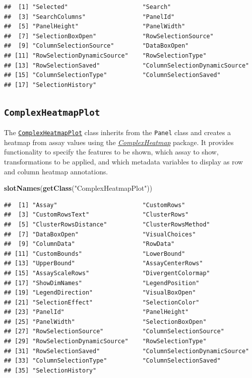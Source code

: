 \documentclass[
]{book}
\newenvironment{Shaded}{\begin{snugshade}}{\end{snugshade}}
\newcommand{\KeywordTok}[1]{\textcolor[rgb]{0.13,0.29,0.53}{\textbf{#1}}}
\newcommand{\NormalTok}[1]{#1}
\newcommand{\StringTok}[1]{\textcolor[rgb]{0.31,0.60,0.02}{#1}}
\begin{document}
\begin{verbatim}
##  [1] "Selected"                     "Search"                      
##  [3] "SearchColumns"                "PanelId"                     
##  [5] "PanelHeight"                  "PanelWidth"                  
##  [7] "SelectionBoxOpen"             "RowSelectionSource"          
##  [9] "ColumnSelectionSource"        "DataBoxOpen"                 
## [11] "RowSelectionDynamicSource"    "RowSelectionType"            
## [13] "RowSelectionSaved"            "ColumnSelectionDynamicSource"
## [15] "ColumnSelectionType"          "ColumnSelectionSaved"        
## [17] "SelectionHistory"
\end{verbatim}

\hypertarget{complexheatmapplot}{%
\subsection{\texorpdfstring{\texttt{ComplexHeatmapPlot}}{ComplexHeatmapPlot}}\label{complexheatmapplot}}

The \href{https://isee.github.io/iSEE/reference/ComplexHeatmapPlot-class.html}{\texttt{ComplexHeatmapPlot}} class inherits from the \texttt{Panel} class and creates a heatmap from assay values using the \emph{\href{https://bioconductor.org/packages/3.11/ComplexHeatmap}{ComplexHeatmap}} package.
It provides functionality to specify the features to be shown, which assay to show, transformations to be applied, and which metadata variables to display as row and column heatmap annotations.

\begin{Shaded}
\begin{Highlighting}[]
\KeywordTok{slotNames}\NormalTok{(}\KeywordTok{getClass}\NormalTok{(}\StringTok{"ComplexHeatmapPlot"}\NormalTok{))}
\end{Highlighting}
\end{Shaded}

\begin{verbatim}
##  [1] "Assay"                        "CustomRows"                  
##  [3] "CustomRowsText"               "ClusterRows"                 
##  [5] "ClusterRowsDistance"          "ClusterRowsMethod"           
##  [7] "DataBoxOpen"                  "VisualChoices"               
##  [9] "ColumnData"                   "RowData"                     
## [11] "CustomBounds"                 "LowerBound"                  
## [13] "UpperBound"                   "AssayCenterRows"             
## [15] "AssayScaleRows"               "DivergentColormap"           
## [17] "ShowDimNames"                 "LegendPosition"              
## [19] "LegendDirection"              "VisualBoxOpen"               
## [21] "SelectionEffect"              "SelectionColor"              
## [23] "PanelId"                      "PanelHeight"                 
## [25] "PanelWidth"                   "SelectionBoxOpen"            
## [27] "RowSelectionSource"           "ColumnSelectionSource"       
## [29] "RowSelectionDynamicSource"    "RowSelectionType"            
## [31] "RowSelectionSaved"            "ColumnSelectionDynamicSource"
## [33] "ColumnSelectionType"          "ColumnSelectionSaved"        
## [35] "SelectionHistory"
\end{verbatim}
\end{document}
